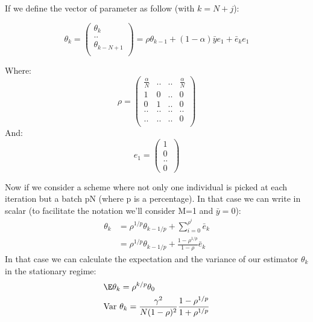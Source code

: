 \documentclass[a4paper]{article}
\theoremstyle{plain}
\theoremstyle{plain}
\theoremstyle{definition}
\begin{document}
If we define the vector of parameter as follow (with $k=N+j$):

\begin{equation}
\theta_{k} = 
\left(
\begin{array}{c}
\theta_{k}\\
..\\
\theta_{k-N+1}\\
\end{array}
\right) = \rho \theta_{k-1} + (1-\alpha)\bar{y}e_1 + \bar{e}_k e_1
\end{equation}

Where:
\begin{equation}
\rho = \begin{pmatrix} 
\frac{\alpha}{N} & .. & .. & \frac{\alpha}{N} \\
1 & 0 & .. & 0\\
0 & 1 & .. & 0\\
.. & .. & .. & ..\\
.. & .. & .. & 0\\
\end{pmatrix}
\end{equation}
And:
\begin{equation}
e_1 = \begin{pmatrix} 
1\\
0\\
..\\
0\
\end{pmatrix} 
\end{equation}

\noindent Now if we consider a scheme where not only one individual is picked at each iteration but a batch pN (where p is a percentage). In that case we can write in scalar (to facilitate the notation we'll consider M=1 and $\bar{y} = 0$):
\begin{equation}
\begin{split}
\theta_k & = \rho^{1/p} \theta_{k-1/p} + \sum_{i=0}^{\rho^{i}}\bar{e}_k\\
& =  \rho^{1/p} \theta_{k-1/p} + \frac{1-\rho^{1/p}}{1-\rho}\bar{e}_k
\end{split}
\end{equation}
In that case we can calculate the expectation and the variance of our estimator $\theta_k$ in the stationary regime:
\begin{equation}
\begin{split}
& \E \theta_k = \rho^{k/p}\theta_0\\
& \textrm{Var } \theta_k = \frac{\gamma^2}{N(1-\rho)^2}\frac{1-\rho^{1/p}}{1+\rho^{1/p}}
\end{split}
\end{equation}
\end{document}
